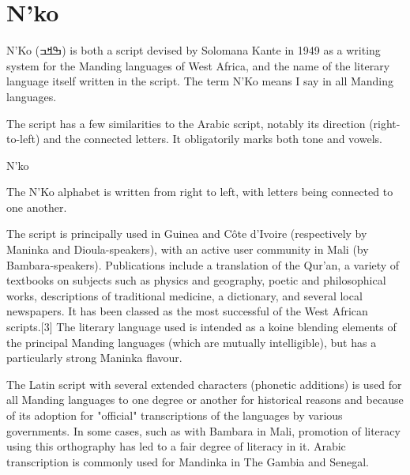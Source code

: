 \section{N'ko}

\newfontfamily{}

N'Ko {\nko(ߒߞߏ)} is both a script devised by Solomana Kante in 1949 as a writing system for the Manding languages of West Africa, and the name of the literary language itself written in the script. The term N'Ko means I say in all Manding languages.

The script has a few similarities to the Arabic script, notably its direction (right-to-left) and the connected letters. It obligatorily marks both tone and vowels.


\begin{scriptexample}[]{N'ko}
\end{scriptexample}

The N'Ko alphabet is written from right to left, with letters being connected to one another.

The script is principally used in Guinea and Côte d'Ivoire (respectively by Maninka and Dioula-speakers), with an active user community in Mali (by Bambara-speakers). Publications include a translation of the Qur'an, a variety of textbooks on subjects such as physics and geography, poetic and philosophical works, descriptions of traditional medicine, a dictionary, and several local newspapers. It has been classed as the most successful of the West African scripts.[3] The literary language used is intended as a koine blending elements of the principal Manding languages (which are mutually intelligible), but has a particularly strong Maninka flavour.

The Latin script with several extended characters (phonetic additions) is used for all Manding languages to one degree or another for historical reasons and because of its adoption for "official" transcriptions of the languages by various governments. In some cases, such as with Bambara in Mali, promotion of literacy using this orthography has led to a fair degree of literacy in it. Arabic transcription is commonly used for Mandinka in The Gambia and Senegal.

